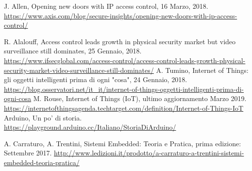 \documentclass[12pt]{report}
\begin{document}
%
%
\begin{thebibliography}{00}
	

J. Allen, Opening new doors with IP access control, 16 Marzo, 2018. \url{https://www.axis.com/blog/secure-insights/opening-new-doors-with-ip-access-control/}
%

R. Alalouff, Access control leads growth in physical security market but video surveillance still dominates, 25 Gennaio, 2018.
\url{https://www.ifsecglobal.com/access-control/access-control-leads-growth-physical-security-market-video-surveillance-still-dominates/}
%
A. Tumino, Internet of Things: gli oggetti intelligenti prima di ogni "cosa", 24 Gennaio, 2018.
\url{https://blog.osservatori.net/it_it/internet-of-things-oggetti-intelligenti-prima-di-ogni-cosa}
%
M. Rouse, Internet of Things (IoT), ultimo aggiornamento Marzo 2019.
\url{https://internetofthingsagenda.techtarget.com/definition/Internet-of-Things-IoT}
% 
Arduino, Un po' di storia.
\url{https://playground.arduino.cc/Italiano/StoriaDiArduino/}
%

A. Carraturo, A. Trentini, Sistemi Embedded: Teoria e Pratica, prima edizione: Settembre 2017.
\url{http://www.ledizioni.it/prodotto/a-carraturo-a-trentini-sistemi-embedded-teoria-pratica/}
%

\end{thebibliography}
%
\end{document}
